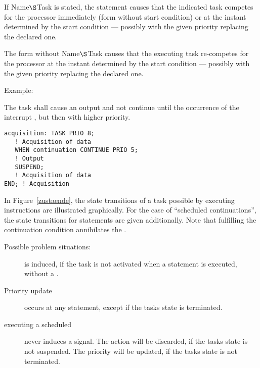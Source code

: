 If Name$\S $Task is stated, the statement causes that the indicated task
competes for the processor immediately (form without start condition) or
at the instant determined by the start condition --- possibly with the
given priority replacing the declared one.

The form without Name$\S $Task causes that the executing task re-competes
for the processor at the instant determined by the start condition ---
possibly with the given priority replacing the declared one.

Example:

The task  shall cause an output and not continue until
the occurrence of the interrupt , but then with higher
priority.

\begin{lstlisting}
acquisition: TASK PRIO 8;
   ! Acquisition of data
   WHEN continuation CONTINUE PRIO 5;
   ! Output
   SUSPEND;
   ! Acquisition of data
END; ! Acquisition
\end{lstlisting}

In Figure~\ref{zustaende},
the state transitions of a task possible by executing 
instructions are illustrated graphically. For the case of
``scheduled continuations'', the state transitions for 
 statements are
given additionally.
Note that fulfilling the continuation condition annihilates the
.

Possible problem situations:
\begin{description}
\item[] is induced, if the task is not activated when 
a  statement is executed, without a .
\item[Priority update] occurs at any  statement,
 except if the tasks state is terminated.
\item[executing a scheduled ] never induces a signal. The action will
   be discarded, if the tasks state is not suspended. The priority will be 
   updated, if the tasks state is not terminated.
\end{description}


